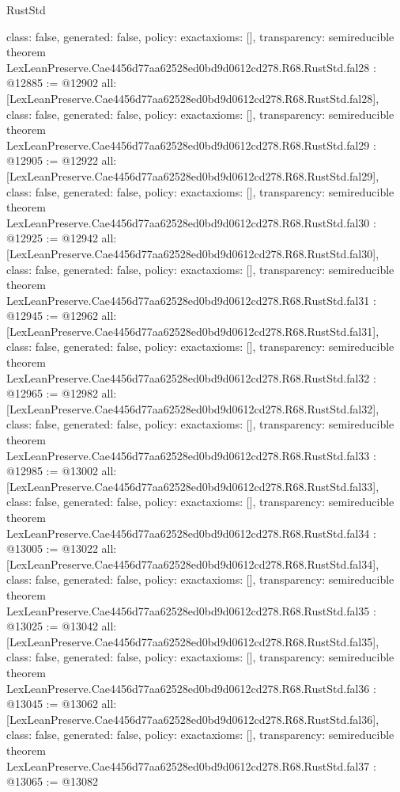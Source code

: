 \begin{lexlean}{RustStd}
\begin{coremodule}
{  class: false,
  generated: false,
  policy: exact{axioms: []},
  transparency: semireducible
}
theorem LexLeanPreserve.Cae4456d77aa62528ed0bd9d0612cd278.R68.RustStd.fal28 : @12885 := @12902 {
  all: [LexLeanPreserve.Cae4456d77aa62528ed0bd9d0612cd278.R68.RustStd.fal28],
  class: false,
  generated: false,
  policy: exact{axioms: []},
  transparency: semireducible
}
theorem LexLeanPreserve.Cae4456d77aa62528ed0bd9d0612cd278.R68.RustStd.fal29 : @12905 := @12922 {
  all: [LexLeanPreserve.Cae4456d77aa62528ed0bd9d0612cd278.R68.RustStd.fal29],
  class: false,
  generated: false,
  policy: exact{axioms: []},
  transparency: semireducible
}
theorem LexLeanPreserve.Cae4456d77aa62528ed0bd9d0612cd278.R68.RustStd.fal30 : @12925 := @12942 {
  all: [LexLeanPreserve.Cae4456d77aa62528ed0bd9d0612cd278.R68.RustStd.fal30],
  class: false,
  generated: false,
  policy: exact{axioms: []},
  transparency: semireducible
}
theorem LexLeanPreserve.Cae4456d77aa62528ed0bd9d0612cd278.R68.RustStd.fal31 : @12945 := @12962 {
  all: [LexLeanPreserve.Cae4456d77aa62528ed0bd9d0612cd278.R68.RustStd.fal31],
  class: false,
  generated: false,
  policy: exact{axioms: []},
  transparency: semireducible
}
theorem LexLeanPreserve.Cae4456d77aa62528ed0bd9d0612cd278.R68.RustStd.fal32 : @12965 := @12982 {
  all: [LexLeanPreserve.Cae4456d77aa62528ed0bd9d0612cd278.R68.RustStd.fal32],
  class: false,
  generated: false,
  policy: exact{axioms: []},
  transparency: semireducible
}
theorem LexLeanPreserve.Cae4456d77aa62528ed0bd9d0612cd278.R68.RustStd.fal33 : @12985 := @13002 {
  all: [LexLeanPreserve.Cae4456d77aa62528ed0bd9d0612cd278.R68.RustStd.fal33],
  class: false,
  generated: false,
  policy: exact{axioms: []},
  transparency: semireducible
}
theorem LexLeanPreserve.Cae4456d77aa62528ed0bd9d0612cd278.R68.RustStd.fal34 : @13005 := @13022 {
  all: [LexLeanPreserve.Cae4456d77aa62528ed0bd9d0612cd278.R68.RustStd.fal34],
  class: false,
  generated: false,
  policy: exact{axioms: []},
  transparency: semireducible
}
theorem LexLeanPreserve.Cae4456d77aa62528ed0bd9d0612cd278.R68.RustStd.fal35 : @13025 := @13042 {
  all: [LexLeanPreserve.Cae4456d77aa62528ed0bd9d0612cd278.R68.RustStd.fal35],
  class: false,
  generated: false,
  policy: exact{axioms: []},
  transparency: semireducible
}
theorem LexLeanPreserve.Cae4456d77aa62528ed0bd9d0612cd278.R68.RustStd.fal36 : @13045 := @13062 {
  all: [LexLeanPreserve.Cae4456d77aa62528ed0bd9d0612cd278.R68.RustStd.fal36],
  class: false,
  generated: false,
  policy: exact{axioms: []},
  transparency: semireducible
}
theorem LexLeanPreserve.Cae4456d77aa62528ed0bd9d0612cd278.R68.RustStd.fal37 : @13065 := @13082 {
}
\end{coremodule}
\end{lexlean}
